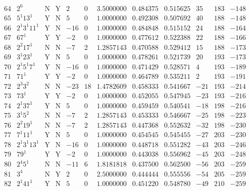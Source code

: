 \documentclass[11pt,reqno,a4letter]{article}
\numberwithin{figure}{section}
\numberwithin{table}{section}
\theoremstyle{plain}
\numberwithin{theorem}{section}
\theoremstyle{definition}
\begin{document}
\begin{table}[ht]
\begin{equation*}
{\begin{array}{cc|cc|ccc|cc|ccc}
 64 & 2^6 & \text{N} & \text{Y} & 2 & 0 & 3.5000000 & 0.484375 & 0.515625 & 35 & 183 & -148 \\
 65 & 5^1 13^1 & \text{Y} & \text{N} & 5 & 0 & 1.0000000 & 0.492308 & 0.507692 & 40 & 188 & -148 \\
 66 & 2^1 3^1 11^1 & \text{Y} & \text{N} & -16 & 0 & 1.0000000 & 0.484848 & 0.515152 & 24 & 188 & -164 \\
 67 & 67^1 & \text{Y} & \text{Y} & -2 & 0 & 1.0000000 & 0.477612 & 0.522388 & 22 & 188 & -166 \\
 68 & 2^2 17^1 & \text{N} & \text{N} & -7 & 2 & 1.2857143 & 0.470588 & 0.529412 & 15 & 188 & -173 \\
 69 & 3^1 23^1 & \text{Y} & \text{N} & 5 & 0 & 1.0000000 & 0.478261 & 0.521739 & 20 & 193 & -173 \\
 70 & 2^1 5^1 7^1 & \text{Y} & \text{N} & -16 & 0 & 1.0000000 & 0.471429 & 0.528571 & 4 & 193 & -189 \\
 71 & 71^1 & \text{Y} & \text{Y} & -2 & 0 & 1.0000000 & 0.464789 & 0.535211 & 2 & 193 & -191 \\
 72 & 2^3 3^2 & \text{N} & \text{N} & -23 & 18 & 1.4782609 & 0.458333 & 0.541667 & -21 & 193 & -214 \\
 73 & 73^1 & \text{Y} & \text{Y} & -2 & 0 & 1.0000000 & 0.452055 & 0.547945 & -23 & 193 & -216 \\
 74 & 2^1 37^1 & \text{Y} & \text{N} & 5 & 0 & 1.0000000 & 0.459459 & 0.540541 & -18 & 198 & -216 \\
 75 & 3^1 5^2 & \text{N} & \text{N} & -7 & 2 & 1.2857143 & 0.453333 & 0.546667 & -25 & 198 & -223 \\
 76 & 2^2 19^1 & \text{N} & \text{N} & -7 & 2 & 1.2857143 & 0.447368 & 0.552632 & -32 & 198 & -230 \\
 77 & 7^1 11^1 & \text{Y} & \text{N} & 5 & 0 & 1.0000000 & 0.454545 & 0.545455 & -27 & 203 & -230 \\
 78 & 2^1 3^1 13^1 & \text{Y} & \text{N} & -16 & 0 & 1.0000000 & 0.448718 & 0.551282 & -43 & 203 & -246 \\
 79 & 79^1 & \text{Y} & \text{Y} & -2 & 0 & 1.0000000 & 0.443038 & 0.556962 & -45 & 203 & -248 \\
 80 & 2^4 5^1 & \text{N} & \text{N} & -11 & 6 & 1.8181818 & 0.437500 & 0.562500 & -56 & 203 & -259 \\
 81 & 3^4 & \text{N} & \text{Y} & 2 & 0 & 2.5000000 & 0.444444 & 0.555556 & -54 & 205 & -259 \\
 82 & 2^1 41^1 & \text{Y} & \text{N} & 5 & 0 & 1.0000000 & 0.451220 & 0.548780 & -49 & 210 & -259 \\

\end{array}}
\end{equation*}
\end{table}
\end{document}
